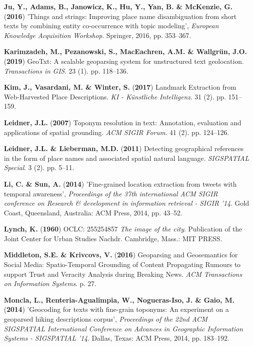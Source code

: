 \documentclass[10pt,]{article}
\newenvironment{cslreferences}%
  {}%
  {\par}
\begin{document}
\begin{cslreferences}
\leavevmode\hypertarget{ref-ju2016}{}%
\textbf{Ju, Y., Adams, B., Janowicz, K., Hu, Y., Yan, B. \& McKenzie,
G.} (\textbf{2016}) 'Things and strings: Improving place name
disambiguation from short texts by combining entity co-occurrence with
topic modeling', \emph{European Knowledge Acquisition Workshop}.
Springer, 2016, pp. 353--367.

\leavevmode\hypertarget{ref-karimzadeh2019}{}%
\textbf{Karimzadeh, M., Pezanowski, S., MacEachren, A.M. \& Wallgrün,
J.O.} (\textbf{2019}) GeoTxt: A scalable geoparsing system for
unstructured text geolocation. \emph{Transactions in GIS}. 23 (1). pp.
118--136.

\leavevmode\hypertarget{ref-kim2017}{}%
\textbf{Kim, J., Vasardani, M. \& Winter, S.} (\textbf{2017}) Landmark
Extraction from Web-Harvested Place Descriptions. \emph{KI - Künstliche
Intelligenz}. 31 (2). pp. 151--159.

\leavevmode\hypertarget{ref-leidner2007}{}%
\textbf{Leidner, J.L.} (\textbf{2007}) Toponym resolution in text:
Annotation, evaluation and applications of spatial grounding. \emph{ACM
SIGIR Forum}. 41 (2). pp. 124--126.

\leavevmode\hypertarget{ref-leidner2011}{}%
\textbf{Leidner, J.L. \& Lieberman, M.D.} (\textbf{2011}) Detecting
geographical references in the form of place names and associated
spatial natural language. \emph{SIGSPATIAL Special}. 3 (2). pp. 5--11.

\leavevmode\hypertarget{ref-li2014}{}%
\textbf{Li, C. \& Sun, A.} (\textbf{2014}) 'Fine-grained location
extraction from tweets with temporal awareness', \emph{Proceedings of
the 37th international ACM SIGIR conference on Research \& development
in information retrieval - SIGIR '14}. Gold Coast, Queensland,
Australia: ACM Press, 2014, pp. 43--52.

\leavevmode\hypertarget{ref-lynch1960}{}%
\textbf{Lynch, K.} (\textbf{1960}) OCLC: 255254857 \emph{The image of
the city}. Publication of the Joint Center for Urban Studies Nachdr.
Cambridge, Mass.: MIT PRESS.

\leavevmode\hypertarget{ref-middleton2016}{}%
\textbf{Middleton, S.E. \& Krivcovs, V.} (\textbf{2016}) Geoparsing and
Geosemantics for Social Media: Spatio-Temporal Grounding of Content
Propagating Rumours to support Trust and Veracity Analysis during
Breaking News. \emph{ACM Transactions on Information Systems}. p. 27.

\leavevmode\hypertarget{ref-moncla2014}{}%
\textbf{Moncla, L., Renteria-Agualimpia, W., Nogueras-Iso, J. \& Gaio,
M.} (\textbf{2014}) 'Geocoding for texts with fine-grain toponyms: An
experiment on a geoparsed hiking descriptions corpus', \emph{Proceedings
of the 22nd ACM SIGSPATIAL International Conference on Advances in
Geographic Information Systems - SIGSPATIAL '14}. Dallas, Texas: ACM
Press, 2014, pp. 183--192.


\end{cslreferences}
\end{document}
